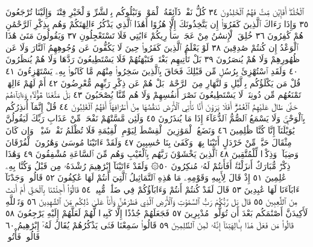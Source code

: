 ٱلْخُلْدَۖ أَفَإِي۟ن مِّتَّ فَهُمُ ٱلْخَٰلِدُونَ ٣٤ كُلُّ نَفْسࣲ ذَآئِقَةُ
ٱلْمَوْتِۗ وَنَبْلُوكُم بِٱلشَّرِّ وَٱلْخَيْرِ فِتْنَةࣰۖ وَإِلَيْنَا تُرْجَعُونَ ٣٥
وَإِذَا رَءَاكَ ٱلَّذِينَ كَفَرُوٓا۟ إِن يَتَّخِذُونَكَ إِلَّا هُزُوًا أَهَٰذَا
ٱلَّذِي يَذْكُرُ ءَالِهَتَكُمْ وَهُم بِذِكْرِ ٱلرَّحْمَٰنِ هُمْ
كَٰفِرُونَ ٣٦ خُلِقَ ٱلْإِنسَٰنُ مِنْ عَجَلࣲۚ سَأُو۟رِيكُمْ
ءَايَٰتِي فَلَا تَسْتَعْجِلُونِ ٣٧ وَيَقُولُونَ مَتَىٰ هَٰذَا ٱلْوَعْدُ
إِن كُنتُمْ صَٰدِقِينَ ٣٨ لَوْ يَعْلَمُ ٱلَّذِينَ كَفَرُوا۟ حِينَ
لَا يَكُفُّونَ عَن وُجُوهِهِمُ ٱلنَّارَ وَلَا عَن ظُهُورِهِمْ وَلَا
هُمْ يُنصَرُونَ ٣٩ بَلْ تَأْتِيهِم بَغْتَةࣰ فَتَبْهَتُهُمْ فَلَا
يَسْتَطِيعُونَ رَدَّهَا وَلَا هُمْ يُنظَرُونَ ٤٠ وَلَقَدِ ٱسْتُهْزِئَ
بِرُسُلࣲ مِّن قَبْلِكَ فَحَاقَ بِٱلَّذِينَ سَخِرُوا۟ مِنْهُم مَّا كَانُوا۟
بِهِۦ يَسْتَهْزِءُونَ ٤١ قُلْ مَن يَكْلَؤُكُم بِٱلَّيْلِ وَٱلنَّهَارِ
مِنَ ٱلرَّحْمَٰنِۚ بَلْ هُمْ عَن ذِكْرِ رَبِّهِم مُّعْرِضُونَ ٤٢
أَمْ لَهُمْ ءَالِهَةࣱ تَمْنَعُهُم مِّن دُونِنَاۚ لَا يَسْتَطِيعُونَ نَصْرَ
أَنفُسِهِمْ وَلَا هُم مِّنَّا يُصْحَبُونَ ٤٣ بَلْ مَتَّعْنَا هَٰٓؤُلَآءِ
وَءَابَآءَهُمْ حَتَّىٰ طَالَ عَلَيْهِمُ ٱلْعُمُرُۗ أَفَلَا يَرَوْنَ أَنَّا نَأْتِي
ٱلْأَرْضَ نَنقُصُهَا مِنْ أَطْرَافِهَآۚ أَفَهُمُ ٱلْغَٰلِبُونَ ٤٤
قُلْ إِنَّمَآ أُنذِرُكُم بِٱلْوَحْيِۚ وَلَا يَسْمَعُ ٱلصُّمُّ ٱلدُّعَآءَ إِذَا
مَا يُنذَرُونَ ٤٥ وَلَئِن مَّسَّتْهُمْ نَفْحَةࣱ مِّنْ عَذَابِ رَبِّكَ
لَيَقُولُنَّ يَٰوَيْلَنَآ إِنَّا كُنَّا ظَٰلِمِينَ ٤٦ وَنَضَعُ ٱلْمَوَٰزِينَ
ٱلْقِسْطَ لِيَوْمِ ٱلْقِيَٰمَةِ فَلَا تُظْلَمُ نَفْسࣱ شَيْـࣰٔاۖ وَإِن كَانَ
مِثْقَالَ حَبَّةࣲ مِّنْ خَرْدَلٍ أَتَيْنَا بِهَاۗ وَكَفَىٰ بِنَا حَٰسِبِينَ ٤٧
وَلَقَدْ ءَاتَيْنَا مُوسَىٰ وَهَٰرُونَ ٱلْفُرْقَانَ وَضِيَآءࣰ وَذِكْرࣰا
لِّلْمُتَّقِينَ ٤٨ ٱلَّذِينَ يَخْشَوْنَ رَبَّهُم بِٱلْغَيْبِ وَهُم مِّنَ ٱلسَّاعَةِ
مُشْفِقُونَ ٤٩ وَهَٰذَا ذِكْرࣱ مُّبَارَكٌ أَنزَلْنَٰهُۚ أَفَأَنتُمْ لَهُۥ
مُنكِرُونَ ٥٠۞ وَلَقَدْ ءَاتَيْنَآ إِبْرَٰهِيمَ رُشْدَهُۥ مِن قَبْلُ وَكُنَّا
بِهِۦ عَٰلِمِينَ ٥١ إِذْ قَالَ لِأَبِيهِ وَقَوْمِهِۦ مَا هَٰذِهِ ٱلتَّمَاثِيلُ ٱلَّتِيٓ
أَنتُمْ لَهَا عَٰكِفُونَ ٥٢ قَالُوا۟ وَجَدْنَآ ءَابَآءَنَا لَهَا عَٰبِدِينَ ٥٣ قَالَ
لَقَدْ كُنتُمْ أَنتُمْ وَءَابَآؤُكُمْ فِي ضَلَٰلࣲ مُّبِينࣲ ٥٤ قَالُوٓا۟ أَجِئْتَنَا
بِٱلْحَقِّ أَمْ أَنتَ مِنَ ٱللَّٰعِبِينَ ٥٥ قَالَ بَل رَّبُّكُمْ رَبُّ ٱلسَّمَٰوَٰتِ
وَٱلْأَرْضِ ٱلَّذِي فَطَرَهُنَّ وَأَنَا۠ عَلَىٰ ذَٰلِكُم مِّنَ ٱلشَّٰهِدِينَ ٥٦
وَتَٱللَّهِ لَأَكِيدَنَّ أَصْنَٰمَكُم بَعْدَ أَن تُوَلُّوا۟ مُدْبِرِينَ ٥٧
فَجَعَلَهُمْ جُذَٰذًا إِلَّا كَبِيرࣰا لَّهُمْ لَعَلَّهُمْ إِلَيْهِ يَرْجِعُونَ ٥٨
قَالُوا۟ مَن فَعَلَ هَٰذَا بِـَٔالِهَتِنَآ إِنَّهُۥ لَمِنَ ٱلظَّٰلِمِينَ ٥٩
قَالُوا۟ سَمِعْنَا فَتࣰى يَذْكُرُهُمْ يُقَالُ لَهُۥٓ إِبْرَٰهِيمُ ٦٠ قَالُوا۟ فَأْتُوا۟
